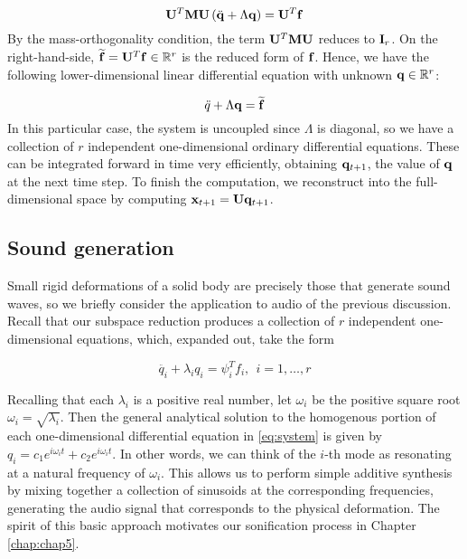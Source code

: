 \begin{equation}
\mathbf{U}^{T} \mathbf{M} \mathbf{U} \left(\ddot{\mathbf{q}} + \Lambda \mathbf{q}\right)= \mathbf{U}^{T} \mathbf{f}
\end{equation}
By the mass-orthogonality condition, the term $\mathbf{U}^{T} \mathbf{M} \mathbf{U}$ reduces to $\mathbf{I}_r$.  On the right-hand-side, $\widetilde{\mathbf{f}} = \mathbf{U}^{T} \mathbf{f} \in \mathbb{R}^r$ is the reduced form of $\mathbf{f}$. Hence, we have the following lower-dimensional linear differential equation with unknown $\mathbf{q} \in \mathbb{R}^{r}$:

\begin{equation}
\ddot{q} + \Lambda \mathbf{q} = \widetilde{\mathbf{f}}
\end{equation}
In this particular case, the system is uncoupled since $\Lambda$ is diagonal, so we have a collection of $r$ independent one-dimensional ordinary differential equations. These can be integrated forward in time very efficiently, obtaining $\mathbf{q}_{t+1}$, the value of $\mathbf{q}$ at the next time step. To finish the computation, we reconstruct into the full-dimensional space by computing $\mathbf{x}_{t+1} = \mathbf{U} \mathbf{q}_{t+1}$.

\subsection{Sound generation}
Small rigid deformations of a solid body are precisely those that generate sound waves, so we briefly consider the application to audio of the previous discussion. Recall that our subspace reduction produces a collection of $r$ independent one-dimensional equations, which, expanded out, take the form

\begin{equation}
\label{eq:system}
\ddot{q_i} + \lambda_i q_i = \psi_i^{T} f_i, \ \ i = 1, \dots, r
\end{equation}

Recalling that each $\lambda_i$ is a positive real number, let $\omega_i$ be the positive square root $\omega_i = \sqrt{\lambda_i}$. Then the general analytical solution to the homogenous portion of each one-dimensional differential equation in \ref{eq:system} is given by $q_i = c_1 e^{i \omega_i t} + c_2 e^{i \omega_i t}$. In other words, we can think of the $i$-th mode as resonating at a natural frequency of $\omega_i$. This allows us to perform simple additive synthesis by mixing together a collection of sinusoids at the corresponding frequencies, generating the audio signal that corresponds to the physical deformation. The spirit of this basic approach motivates
our sonification process in Chapter \ref{chap:chap5}.

